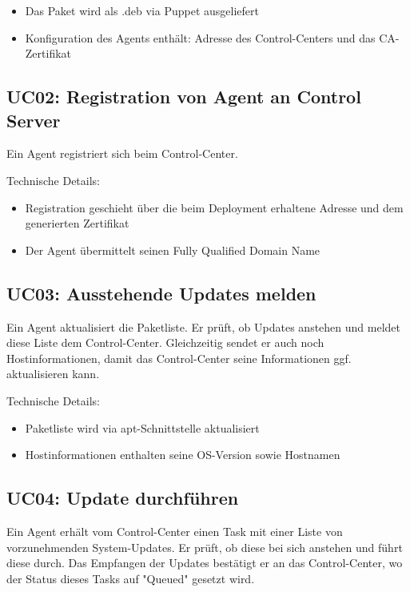 \begin{itemize}
    \item Das Paket wird als .deb via Puppet ausgeliefert
    \item Konfiguration des Agents enthält: Adresse des Control-Centers und das CA-Zertifikat
\end{itemize}


\subsection*{UC02: Registration von Agent an Control Server}
\label{sec:uc_02}

Ein Agent registriert sich beim Control-Center.

Technische Details:

\begin{itemize}
    \item Registration geschieht über die beim Deployment erhaltene Adresse und dem generierten Zertifikat
    \item Der Agent übermittelt seinen Fully Qualified Domain Name
\end{itemize}

\subsection*{UC03: Ausstehende Updates melden}
\label{sec:uc_03}

Ein Agent aktualisiert die Paketliste. Er prüft, ob Updates anstehen und meldet diese Liste dem Control-Center. Gleichzeitig sendet er auch noch Hostinformationen, damit das Control-Center seine Informationen ggf. aktualisieren kann.
 

Technische Details:

\begin{itemize}
    \item Paketliste wird via apt-Schnittstelle aktualisiert
    \item Hostinformationen enthalten seine OS-Version sowie Hostnamen
\end{itemize}

\subsection*{UC04: Update durchführen}
\label{sec:uc_04}

Ein Agent erhält vom Control-Center einen Task mit einer Liste von vorzunehmenden System-Updates. Er prüft, ob diese bei sich anstehen und führt diese durch. Das Empfangen der Updates bestätigt er an das Control-Center, wo der Status dieses Tasks auf "Queued" gesetzt wird.

